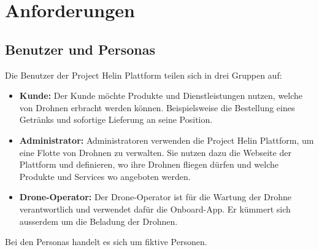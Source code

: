 \chapter{Anforderungen}
\section{Benutzer und Personas}
Die Benutzer der Project Helin Plattform teilen sich in drei Gruppen auf:
\begin{itemize}
	\item{\textbf{Kunde:} Der Kunde möchte Produkte und Dienstleistungen nutzen, welche von Drohnen erbracht werden können. Beispielsweise die Bestellung eines Getränks und sofortige Lieferung an seine Position.}
	\item{\textbf{Administrator:} Administratoren verwenden die Project Helin Plattform, um eine Flotte von Drohnen zu verwalten. Sie nutzen dazu die Webseite der Plattform und definieren, wo ihre Drohnen fliegen dürfen und welche Produkte und Services wo angeboten werden.}
	\item{\textbf{Drone-Operator:} Der Drone-Operator ist für die Wartung der Drohne verantwortlich und verwendet dafür die Onboard-App. Er kümmert sich ausserdem um die Beladung der Drohnen.}
\end{itemize}

Bei den Personas handelt es sich um fiktive Personen.
